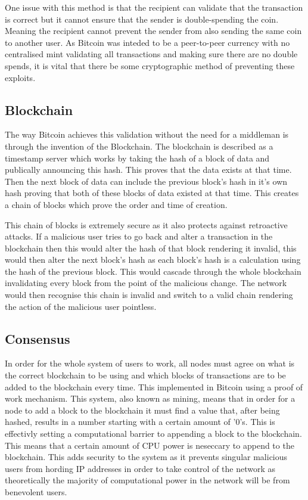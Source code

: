 \documentclass{l4proj}
\begin{document}
One issue with this method is that the recipient can validate that the transaction is correct but it cannot ensure
that the sender is double-spending the coin. Meaning the recipient cannot prevent the sender from also sending the 
same coin to another user. As Bitcoin was inteded to be a peer-to-peer currency with no centralised mint validating
all transactions and making sure there are no double spends, it is vital that there be some cryptographic method of
preventing these exploits.


\subsection{Blockchain}
The way Bitcoin achieves this validation without the need for a middleman is through the invention of the Blockchain.
The blockchain is described as a timestamp server which works by taking the hash of a block of data and publically
announcing this hash. This proves that the data exists at that time. Then the next block of data can include the
previous block's hash in it's own hash proving that both of these blocks of data existed at that time. This creates 
a chain of blocks which prove the order and time of creation.

This chain of blocks is extremely secure as it also protects against retroactive attacks. If a malicious user tries
to go back and alter a transaction in the blockchain then this would alter the hash of that block rendering it invalid,
this would then alter the next block's hash as each block's hash is a calculation using the hash of the previous block.
This would cascade through the whole blockchain invalidating every block from the point of the malicious change. The 
network would then recognise this chain is invalid and switch to a valid chain rendering the action of the malicious
user pointless.

\subsection{Consensus}
In order for the whole system of users to work, all nodes must agree on what is the correct blockchain to be using and
which blocks of transactions are to be added to the blockchain every time. This implemented in Bitcoin using a proof of
work mechanism. This system, also known as mining, means that in order for a node to add a block to the blockchain it
must find a value that, after being hashed, results in a number starting with a certain amount of '0's. This is 
effectivly setting a computational barrier to appending a block to the blockchain. This means that a certain amount of
CPU power is neseccary to append to the blockchain. This adds security to the system as it prevents singular malicious
users from hording IP addresses in order to take control of the network as theoretically the majority of computational
power in the network will be from benevolent users.
\end{document}

